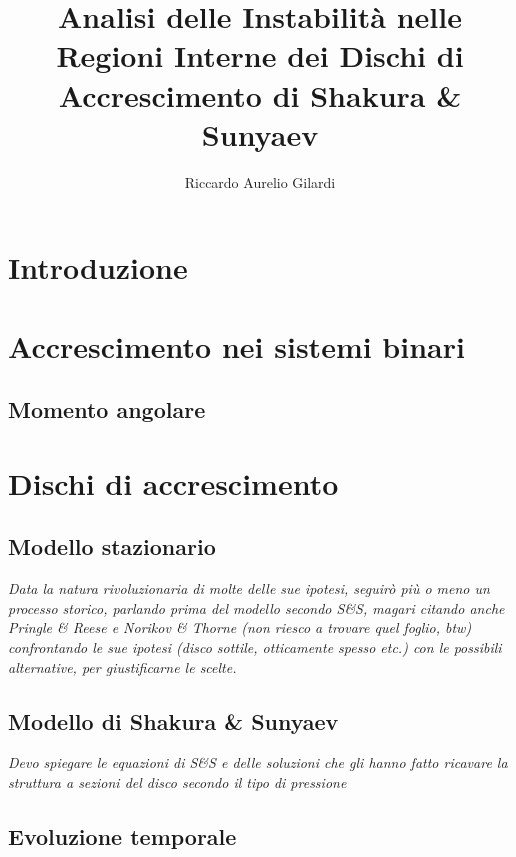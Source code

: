 \documentclass[a4paper]{article}
\newcommand{\subtitle}[1]{%
	\posttitle{%
		\par\end{center}
	\begin{center}\large#1\end{center}
	\vskip0.5em}%
}
\begin{document}
\title{Analisi delle Instabilità nelle Regioni Interne dei Dischi di Accrescimento di Shakura \& Sunyaev}
\subtitle{Appunti}
\author{Riccardo Aurelio Gilardi}
\maketitle

\newpage
\tableofcontents
\newpage

\section*{Introduzione}

\section{Accrescimento nei sistemi binari}
	\subsection{Momento angolare}
	
\section{Dischi di accrescimento}
	\subsection{Modello stazionario}
	
		\emph{Data la natura rivoluzionaria di molte delle sue ipotesi, seguirò più o meno un processo storico, parlando prima del modello secondo S\&S, magari citando anche Pringle \& Reese e Norikov \& Thorne (non riesco a trovare quel foglio, btw) confrontando le sue ipotesi (disco sottile, otticamente spesso etc.) con le possibili alternative, per giustificarne le scelte.}

	\subsection{Modello di Shakura \& Sunyaev}

	\emph{Devo spiegare le equazioni di S\&S e delle soluzioni che gli hanno fatto ricavare la struttura a sezioni del disco secondo il tipo di pressione}
	
	\subsection{Evoluzione temporale}
\end{document}
